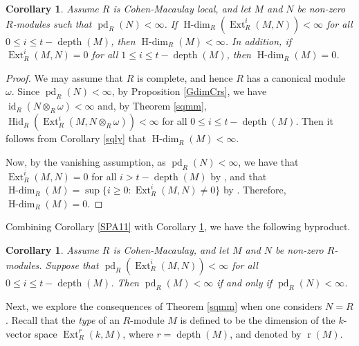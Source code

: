 \documentclass[11pt, a4paper,pagebackref]{amsart}
\numberwithin{equation}{section}
\newtheorem{corollary}[theorem]{Corollary}
\theoremstyle{definition}
\newtheorem{remark and definition}[theorem]{Remark and Definition}
\newtheorem{remark and notation}[theorem]{Remark and Notation}
\newcommand\Ext{\operatorname{Ext}}
\newcommand\depth{\operatorname{depth}}
\DeclareMathOperator{\type}{r}
\begin{document}
\begin{corollary}\label{wqq11} \label{daso}
    Assume $R$ is Cohen-Macaulay local, and let $M$ and $N$ be non-zero $R$-modules such that $\operatorname{pd}_R(N)<\infty$. If $\operatorname{H-dim}_R(\Ext_R^i(M,N))<\infty$ for all $0\leq i \leq t-\operatorname{depth} (M)$, then $\operatorname{H-dim}_R(M)<\infty$. In addition, if $\Ext_R^i(M,N)=0$ for all $1\leq i \leq t-\depth (M)$, then $\operatorname{H-dim}_R (M)=0$. 
\end{corollary}
\begin{proof}
    We may assume that $R$ is complete, and hence $R$ has a canonical module $\omega$.  Since $\operatorname{pd}_R(N)<\infty$, by Proposition \ref{GdimCrs}, we have $\operatorname{id}_R(N  \otimes_R \omega)<\infty$ and, by Theorem \ref{sqmm}, $\operatorname{Hid}_R(\Ext_R^i(M, N \otimes_R \omega))<\infty$ for all $0\leq i\leq t-\depth (M)$. Then it follows from Corollary \ref{sqly} that $\operatorname{H-dim}_R(M)<\infty$.

    Now, by the vanishing assumption, as $\operatorname{pd}_R(N)<\infty$, we have that  $\Ext_R^i(M,N)=0$ for all $i>t-\depth (M)$ by \cite[Theorem 4.13]{Stablemoduletheory}, and that 
    $\operatorname{H-dim}_R(M)=\sup\{i \geq 0: \Ext_R^i(M,N)\not=0\}$ by \cite[Theorem 2.6(ii)]{VanishingOfCohomologyOverCompleteIntersectionRings}. Therefore, $\operatorname{H-dim}_R(M)=0$. 
\end{proof}





Combining Corollary \ref{SPA11} with Corollary \ref{wqq11}, we have the following byproduct.

\begin{corollary}\label{qza}
    Assume $R$ is Cohen-Macaulay, and let $M$ and $N$ be non-zero $R$-modules. Suppose that $\operatorname{pd}_R(\Ext_R^i(M,N))<\infty$ for all $0\leq i \leq t-\depth (M)$.  Then $\operatorname{pd}_R(M)<\infty$ if and only if $\operatorname{pd}_R(N)<\infty$.
\end{corollary}


Next, we explore the consequences of Theorem \ref{sqmm} when one considers $N=R$. Recall that the {\it type} of an $R$-module $M$ is defined to be the dimension of the $k$-vector space $\Ext^r_R(k, M)$, where $r = \depth (M)$, and denoted by $\type(M)$. 
\end{document}
